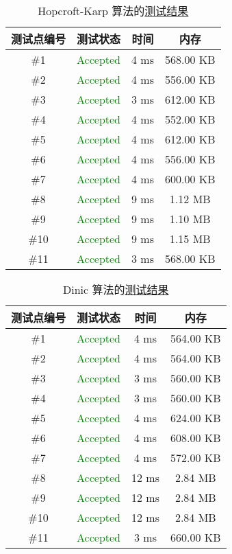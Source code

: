 \begin{table}[H]
	\centering
	\caption{Hopcroft-Karp 算法的\href{https://www.luogu.com.cn/record/195132225}{测试结果}}
	\label{tab:hopcroft_karp_test_results}
	\linewidth
	\begin{tabular}{cccc}
		\toprule
		\textbf{测试点编号} & \textbf{测试状态} & \textbf{时间} & \textbf{内存} \\
		\midrule
		\#1 & \textcolor{green}{Accepted} & 4 ms & 568.00 KB \\
		\#2 & \textcolor{green}{Accepted} & 4 ms & 556.00 KB \\
		\#3 & \textcolor{green}{Accepted} & 3 ms & 612.00 KB \\
		\#4 & \textcolor{green}{Accepted} & 4 ms & 552.00 KB \\
		\#5 & \textcolor{green}{Accepted} & 4 ms & 612.00 KB \\
		\#6 & \textcolor{green}{Accepted} & 4 ms & 556.00 KB \\
		\#7 & \textcolor{green}{Accepted} & 4 ms & 600.00 KB \\
		\#8 & \textcolor{green}{Accepted} & 9 ms & 1.12 MB \\
		\#9 & \textcolor{green}{Accepted} & 9 ms & 1.10 MB \\
		\#10 & \textcolor{green}{Accepted} & 9 ms & 1.15 MB \\
		\#11 & \textcolor{green}{Accepted} & 3 ms & 568.00 KB \\
		\bottomrule
	\end{tabular}
\end{table}

\begin{table}[H]
	\centering
	\caption{Dinic 算法的\href{https://www.luogu.com.cn/record/195132700}{测试结果}}
	\label{tab:dinic_test_results}
	\linewidth
	\begin{tabular}{cccc}
		\toprule
		\textbf{测试点编号} & \textbf{测试状态} & \textbf{时间} & \textbf{内存} \\
		\midrule
		\#1 & \textcolor{green}{Accepted} & 4 ms & 564.00 KB \\
		\#2 & \textcolor{green}{Accepted} & 4 ms & 564.00 KB \\
		\#3 & \textcolor{green}{Accepted} & 3 ms & 560.00 KB \\
		\#4 & \textcolor{green}{Accepted} & 3 ms & 560.00 KB \\
		\#5 & \textcolor{green}{Accepted} & 4 ms & 624.00 KB \\
		\#6 & \textcolor{green}{Accepted} & 4 ms & 608.00 KB \\
		\#7 & \textcolor{green}{Accepted} & 4 ms & 572.00 KB \\
		\#8 & \textcolor{green}{Accepted} & 12 ms & 2.84 MB \\
		\#9 & \textcolor{green}{Accepted} & 12 ms & 2.84 MB \\
		\#10 & \textcolor{green}{Accepted} & 12 ms & 2.84 MB \\
		\#11 & \textcolor{green}{Accepted} & 3 ms & 660.00 KB \\
		\bottomrule
	\end{tabular}
\end{table}

